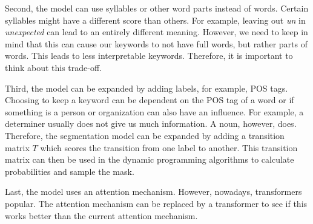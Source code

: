 Second, the model can use syllables or other word parts instead of words.
Certain syllables might have a different score than others. 
For example, leaving out \textit{un} in \textit{unexpected} can lead to an entirely different meaning. 
However, we need to keep in mind that this can cause our keywords to not have full words, but rather parts of words. 
This leads to less interpretable keywords.
Therefore, it is important to think about this trade-off.

Third, the model can be expanded by adding labels, for example, POS tags. 
Choosing to keep a keyword can be dependent on the POS tag of a word or if something is a person or organization can also have an influence.
For example, a determiner usually does not give us much information. 
A noun, however, does.
Therefore, the segmentation model can be expanded by adding a transition matrix $T$ which scores the transition from one label to another. 
This transition matrix can then be used in the dynamic programming algorithms to calculate probabilities and sample the mask.

Last, the model uses an attention mechanism.
However, nowadays, transformers popular. 
The attention mechanism can be replaced by a transformer to see if this works better than the current attention mechanism.